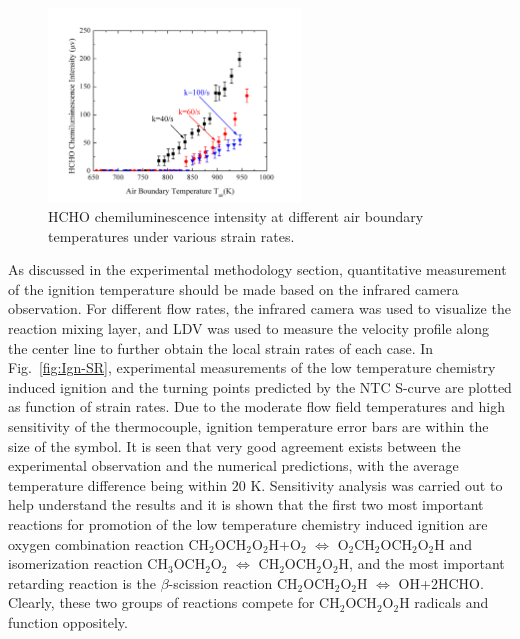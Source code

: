 \documentclass[review,3p,times]{elsarticleUS}
\begin{document}
\begin{figure}[ht]
  \centering
  \scriptsize
  \vspace{-0.1in}
  \includegraphics[width=0.6\textwidth]{PMT.png}
  \normalsize
  \vspace{-0.1in}
  \caption{HCHO chemiluminescence intensity at different air boundary temperatures under various strain rates.}
  \label{fig:PMT}
\end{figure}

As discussed in the experimental methodology section, quantitative measurement of the ignition temperature should be made based on the infrared camera observation. For different flow rates, the infrared camera was used to visualize the reaction mixing layer, and LDV was used to measure the velocity profile along the center line to further obtain the local strain rates of each case. In Fig.~\ref{fig:Ign-SR}, experimental measurements of the low temperature chemistry induced ignition and the turning points predicted by the NTC S-curve are plotted as function of strain rates. Due to the moderate flow field temperatures and high sensitivity of the thermocouple, ignition temperature error bars are within the size of the symbol. It is seen that very good agreement exists between the experimental observation and the numerical predictions, with the average temperature difference being within $20$ K. Sensitivity analysis was carried out to help understand the results and it is shown that the first two most important reactions for promotion of the low temperature chemistry induced ignition are oxygen combination reaction CH$_2$OCH$_2$O$_2$H+O$_2$ $\Leftrightarrow$ O$_2$CH$_2$OCH$_2$O$_2$H and isomerization reaction CH$_3$OCH$_2$O$_2$ $\Leftrightarrow$ CH$_2$OCH$_2$O$_2$H, and the most important retarding reaction is the $\beta$-scission reaction CH$_2$OCH$_2$O$_2$H $\Leftrightarrow$ OH+$2$HCHO. Clearly, these two groups of reactions compete for CH$_2$OCH$_2$O$_2$H radicals and function oppositely.
\end{document}
